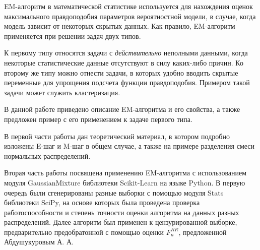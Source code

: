 EM-алгоритм в математической статистике используется для нахождения оценок максимального правдоподобия параметров вероятностной модели, в случае, когда модель зависит от некоторых скрытых данных. Как правило, EM-алгоритм применяется при решении задач двух типов.

К первому типу относятся задачи с \emph{действительно} неполными данными, когда некоторые статистические данные отсутствуют в силу каких-либо причин. Ко второму же типу можно отнести задачи, в которых удобно вводить скрытые переменные для упрощения подсчета функции правдоподобия. Примером такой задачи может служить кластеризация.

В данной работе приведено описание EM-алгоритма и его свойства, а также предложен пример с его применением к задаче первого типа.

В первой части работы дан теоретический материал, в котором подробно изложены E-шаг и M-шаг в общем случае, а также на примере разделения смеси нормальных распределений.

Вторая часть работы посвящена применению EM-алгоритма с использованием модуля GaussianMixture библиотеки Scikit-Learn на языке Python. В первую очередь были сгенерированы разные выборки с помощью модуля Stats библиотеки SciPy, на основе которых была проведена проверка работоспособности и степень точности оценки алгоритма на данных разных распределений. Далее алгоритм был применен к цензурированной выборке, предварительно предобратонной с помощью оценки $F_n^{RR}$, предложенной Абдушукуровым А. А.